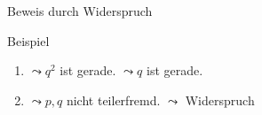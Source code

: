 \begin{frame}[fragile]{Beweis durch Widerspruch}
{\begin{exampleblock}{Beispiel}
\begin{enumerate}
            \item<9-|handout:1> $\leadsto q^2$ ist gerade. \alert<10|handout:0>{$\leadsto q$ ist gerade.}
            \item<10-|handout:1> \alert<10|handout:0>{$\leadsto p,q$ nicht teilerfremd.} \alert<11|handout:0>{$\leadsto$ Widerspruch}
        \end{enumerate}
    \end{exampleblock}
}
\end{frame}